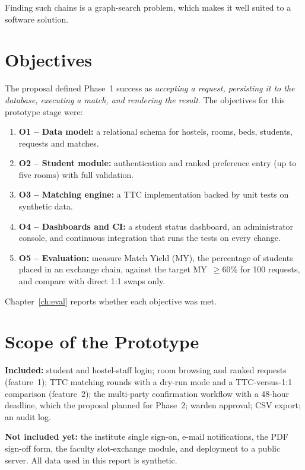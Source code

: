 \documentclass{tietreport}
\begin{document}
Finding such chains is a graph-search problem, which makes it well
suited to a software solution.

\section{Objectives}

The proposal defined Phase~1 success as \emph{accepting a request,
persisting it to the database, executing a match, and rendering
the result}. The objectives for this prototype stage were:

\begin{enumerate}
  \item \textbf{O1 -- Data model:} a relational schema for hostels,
    rooms, beds, students, requests and matches.
  \item \textbf{O2 -- Student module:} authentication and ranked
    preference entry (up to five rooms) with full validation.
  \item \textbf{O3 -- Matching engine:} a TTC implementation backed
    by unit tests on synthetic data.
  \item \textbf{O4 -- Dashboards and CI:} a student status dashboard,
    an administrator console, and continuous integration that runs
    the tests on every change.
  \item \textbf{O5 -- Evaluation:} measure Match Yield (MY), the
    percentage of students placed in an exchange chain, against the
    target MY~$\geq 60\%$ for 100 requests, and compare with direct
    1:1 swaps only.
\end{enumerate}

Chapter~\ref{ch:eval} reports whether each objective was met.

\section{Scope of the Prototype}

\textbf{Included:} student and hostel-staff login; room browsing
and ranked requests (feature~1); TTC matching rounds with a dry-run
mode and a TTC-versus-1:1 comparison (feature~2); the multi-party
confirmation workflow with a 48-hour deadline, which the proposal
planned for Phase~2; warden approval; CSV export; an audit log.

\textbf{Not included yet:} the institute single sign-on, e-mail
notifications, the PDF sign-off form, the faculty slot-exchange
module, and deployment to a public server. All data used in this
report is synthetic.
\end{document}
